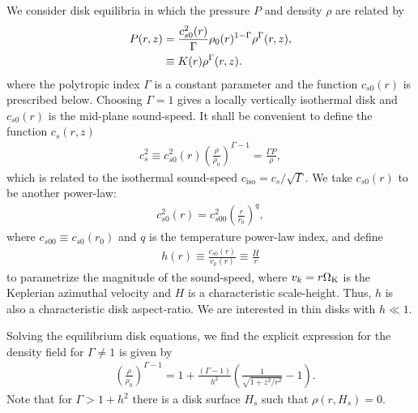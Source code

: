 We consider disk equilibria in which the pressure $P$ and density
$\rho$ are related by   
\begin{align}
  P(r,z) &= 
  \frac{c_{s0}^2(r)}{\Gamma}\rho_0(r)^{1-\Gamma}\rho^\Gamma(r,z),\notag\\
  & \equiv K(r)\rho^{\Gamma}(r,z). \label{eqm_press}
\end{align}
where the polytropic index $\Gamma$ is a  constant parameter  and the
function $c_{s0}(r)$ is prescribed below. Choosing $\Gamma=1$ gives  a 
locally vertically isothermal disk and $c_{s0}(r)$ is the mid-plane
sound-speed. 
It shall be convenient to define the function $c_s(r,z)$ 
\begin{align}
  c_s^2\equiv %
  c_{s0}^2(r)\left(\frac{\rho}{\rho_0}\right)^{\Gamma-1} =
  \frac{\Gamma P}{\rho}, 
\end{align}
which is related to the isothermal sound-speed $c_\mathrm{iso} =
c_s/\sqrt{\Gamma}$. We take $c_{s0}(r)$ to be another power-law:  
\begin{align}
  c_{s0}^2(r)=c_{s00}^2\left(\frac{r}{r_0}\right)^q, 
\end{align}
where $c_{s00}\equiv c_{s0}(r_0)$  and $q$ is the temperature power-law index, and
define   
\begin{align}
   h(r) \equiv \frac{c_{s0}(r)}{v_k(r)} \equiv
  \frac{H}{r} 
\end{align}
to parametrize the magnitude of the sound-speed, where
$v_k=r\Omega_{\rm K}$ is the Keplerian azimuthal velocity and
$H$ is a characteristic scale-height.  Thus, $ h$
is also a characteristic disk aspect-ratio. We are 
interested in thin disks with $ h \ll 1$.%




Solving the equilibrium disk equations, we find the explicit
expression for the density field for 
$\Gamma\neq1$ is given  by
\begin{align}\label{eqm_dens}
  &\left(\frac{\rho}{\rho_0}\right)^{\Gamma-1} = 1 +
  \frac{\left(\Gamma-1\right)}{ h^2}\left(\frac{1}{\sqrt{1+z^2/r^2}}-1\right).
\end{align}
Note that for $\Gamma > 1 +  h^2$ there is a disk surface $H_s$
such that $\rho(r,H_s)=0$. 

